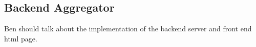 \subsection{Backend Aggregator}
\label{sec:backend-aggregator}

Ben should talk about the implementation of the backend server and front end html page.

